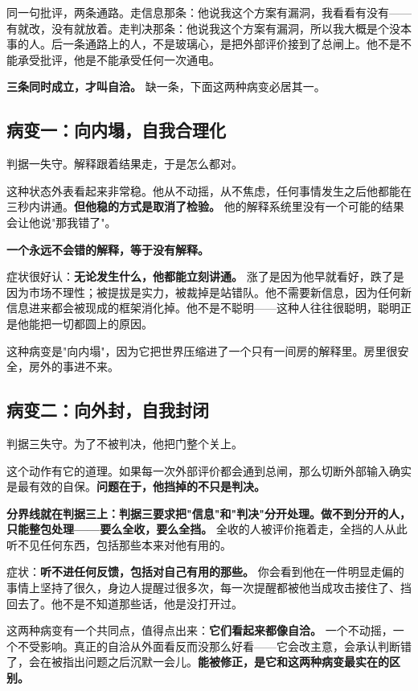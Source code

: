 \documentclass[11pt,a4paper]{ctexart}
\begin{document}
同一句批评，两条通路。走信息那条：他说我这个方案有漏洞，我看看有没有——有就改，没有就放着。走判决那条：他说我这个方案有漏洞，所以我大概是个没本事的人。后一条通路上的人，不是玻璃心，是把外部评价接到了总闸上。他不是不能承受批评，他是不能承受任何一次通电。

\textbf{三条同时成立，才叫自洽。} 缺一条，下面这两种病变必居其一。

\subsection{病变一：向内塌，自我合理化}

判据一失守。解释跟着结果走，于是怎么都对。

这种状态外表看起来非常稳。他从不动摇，从不焦虑，任何事情发生之后他都能在三秒内讲通。\textbf{但他稳的方式是取消了检验。} 他的解释系统里没有一个可能的结果会让他说"那我错了"。

\textbf{一个永远不会错的解释，等于没有解释。}

症状很好认：\textbf{无论发生什么，他都能立刻讲通。} 涨了是因为他早就看好，跌了是因为市场不理性；被提拔是实力，被裁掉是站错队。他不需要新信息，因为任何新信息进来都会被现成的框架消化掉。他不是不聪明——这种人往往很聪明，聪明正是他能把一切都圆上的原因。

这种病变是"向内塌"，因为它把世界压缩进了一个只有一间房的解释里。房里很安全，房外的事进不来。

\subsection{病变二：向外封，自我封闭}

判据三失守。为了不被判决，他把门整个关上。

这个动作有它的道理。如果每一次外部评价都会通到总闸，那么切断外部输入确实是最有效的自保。\textbf{问题在于，他挡掉的不只是判决。}

\textbf{分界线就在判据三上：判据三要求把"信息"和"判决"分开处理。做不到分开的人，只能整包处理——要么全收，要么全挡。} 全收的人被评价拖着走，全挡的人从此听不见任何东西，包括那些本来对他有用的。

症状：\textbf{听不进任何反馈，包括对自己有用的那些。} 你会看到他在一件明显走偏的事情上坚持了很久，身边人提醒过很多次，每一次提醒都被他当成攻击接住了、挡回去了。他不是不知道那些话，他是没打开过。

这两种病变有一个共同点，值得点出来：\textbf{它们看起来都像自洽。} 一个不动摇，一个不受影响。真正的自洽从外面看反而没那么好看——它会改主意，会承认判断错了，会在被指出问题之后沉默一会儿。\textbf{能被修正，是它和这两种病变最实在的区别。}
\end{document}
